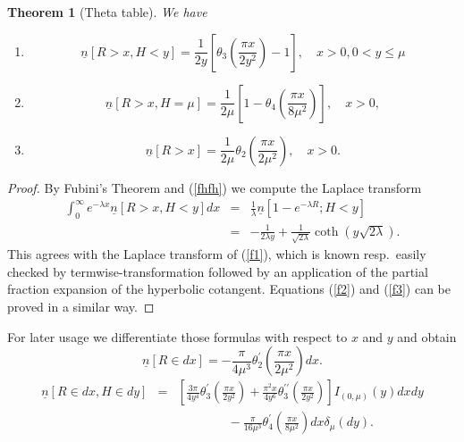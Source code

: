 \documentclass[11pt]{scrartcl}
\newtheorem{theorem}{Theorem}
\begin{document}
\begin{theorem}[Theta table]\label{thetatable}
We have
\begin{enumerate}
\item 
\begin{equation}\label{f1}
\underline{n}[R>x,H<y]=\frac{1}{2y}\left[\theta _{3}\left( \frac{\pi x}{2y^{2}}\right)-1\right],\quad x>0,0<y\leq\mu
\end{equation}

\item 
\begin{equation}\label{f2}
\underline{n}[R>x,H=\mu ]=\frac{1}{2\mu }\left[ 1-\theta _{4}\left( \frac{\pi x}{8\mu ^{2}}\right) \right] ,\quad x>0,
\end{equation}

\item 
\begin{equation}\label{f3}
\underline{n}[R>x]=\frac{1}{2\mu }\theta _{2}\left( \frac{\pi x}{2\mu ^{2}}\right) ,\quad x>0.
\end{equation}
\end{enumerate}
\end{theorem}
\begin{proof}
By Fubini's Theorem and (\ref{fhfh}) we compute the Laplace transform
\begin{eqnarray}
\int_0^\infty e^{-\lambda x}\underline{n}[R>x,H<y]dx&=&\frac1\lambda\underline{n}[1-e^{-\lambda R};H<y]\\
&=&-\frac1{2\lambda y}+\frac1{\sqrt{2\lambda}}\coth(y\sqrt{2\lambda}).
\end{eqnarray}
This agrees with the Laplace transform of (\ref{f1}), which is known resp.\ easily checked
by termwise-transformation followed by an application of the partial fraction expansion of the hyperbolic
cotangent.
Equations (\ref{f2}) and (\ref{f3}) can be proved in a similar way.
\end{proof}
For later usage we differentiate those formulas with respect to $x$ and $y$ and obtain 
\begin{equation}
\underline{n}[R\in dx]=-\frac{\pi }{4\mu ^{3}}\theta _{2}^{\prime }\left( 
\frac{\pi x}{2\mu ^{2}}\right) dx.
\end{equation}
\begin{eqnarray}
\underline{n}[R \in dx,H\in dy]&=& 
\left[ \frac{3\pi }{4y^4}\theta _{3}^{\prime }\left( \frac{\pi x}{2y^{2}}
\right) +\frac{\pi ^{2}x}{4y^{6}}\theta _{3}^{\prime \prime }\left( \frac{\pi x}{2y^{2}}\right) \right] I_{(0,\mu )}(y)dxdy\\
&&\qquad\qquad-\frac{\pi }{16\mu ^{3}}\theta_{4}^{\prime }\left( \frac{\pi x}{8\mu ^{2}}\right) dx\delta _{\mu
}(dy).
\end{eqnarray}
\end{document}
